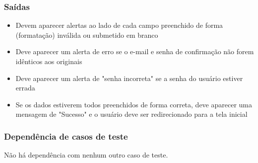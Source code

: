 \subsubsection{Saídas}

\begin{itemize}

	\item Devem aparecer alertas ao lado de cada campo preenchido de forma (formatação) inválida ou submetido em branco
	\item Deve aparecer um alerta de erro se o e-mail e senha de confirmação não forem idênticos aos originais
	\item Deve aparecer um alerta de "senha incorreta" se a senha do usuário estiver errada
	\item Se os dados estiverem todos preenchidos de forma correta, deve aparecer uma mensagem de "Sucesso" e o usuário deve ser redirecionado para a tela inicial
	
\end{itemize}

\subsubsection{Dependência de casos de teste}
Não há dependência com nenhum outro caso de teste.